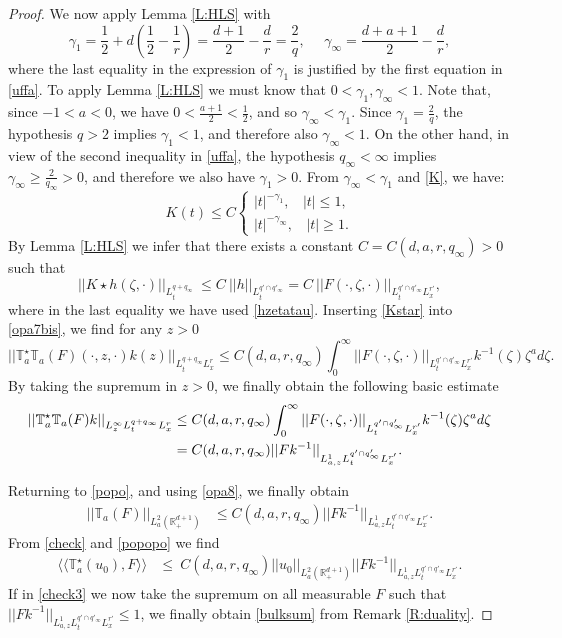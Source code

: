 \documentclass[11pt,letter]{amsart}
\def \RN {\mathbb{R}_+^{d+1}}
\numberwithin{equation}{section}
\newcommand{\sa}{\langle}
\newcommand{\da}{\rangle}
\numberwithin{equation}{section}
\begin{document}
\begin{proof}
We now apply Lemma \ref{L:HLS} with 
\[
\gamma_1 = \frac{1}2 + d(\frac 12 - \frac 1r) = \frac{d+1}2 - \frac dr = \frac 2q,\ \ \ \ \ \ \gamma_\infty = \frac{d+a+1}2 - \frac dr,
\]
where the last equality in the expression of $\gamma_1$ is justified by the first equation in \eqref{uffa}.
To apply Lemma \ref{L:HLS} we must know that $0<\gamma_1, \gamma_\infty <1$.  
Note that, since $-1<a<0$, we have $0<\frac{a+1}2 < \frac 12$, and so $\gamma_\infty<\gamma_1$. Since $\gamma_1 = \frac 2q$, the hypothesis $q>2$ implies $\gamma_1<1$, and therefore also $\gamma_\infty<1$. On the other hand, in view of the second inequality in \eqref{uffa}, the hypothesis $q_\infty <\infty$ implies $\gamma_\infty \ge  \frac{2}{q_\infty} >0$, and therefore we also have $\gamma_1>0$. From $\gamma_\infty<\gamma_1$ and \eqref{K}, we have: 
\[
K(t) \le C \begin{cases} 
|t|^{-\gamma_1},  \ \ \ \ |t|\le 1,
\\
|t|^{-\gamma_\infty},\ \ \ \ |t|\ge 1.
\end{cases}
\]
By Lemma \ref{L:HLS} we infer that there exists a constant $C=C(d,a,r,q_\infty)>0$ such that  
\begin{equation}\label{Kstar}
||K\star h(\zeta,\cdot)||_{L^{q+q_\infty}_t}\ \le C\ ||h||_{L^{q'\cap q'_\infty}_t} = C\ ||F(\cdot,\zeta,\cdot)||_{L^{q'\cap q'_\infty}_t L^{r'}_x},
\end{equation}
where in the last equality we have used \eqref{hzetatau}. Inserting \eqref{Kstar} into \eqref{opa7bis}, we find for any $z>0$
\[
||\mathbb T_a^\star \mathbb T_a(F)(\cdot,z,\cdot) k(z)||_{L^{q+q_\infty}_t L^r_x} \le C(d,a,r,q_\infty) \int_0^\infty ||F(\cdot,\zeta,\cdot)||_{L^{q'\cap q'_\infty}_t L^{r'}_x} k^{-1}(\zeta) \zeta^a d\zeta.
\]
By taking the supremum in $z>0$, we finally obtain the following basic estimate
\begin{align}\label{opa8}
||\mathbb T_a^\star \mathbb T_a(F) k||_{L^\infty_z L^{q+q_\infty}_t L^r_x} & \le C(d,a,r,q_\infty)  \int_0^\infty ||F(\cdot,\zeta,\cdot)||_{L^{q'\cap q'_\infty}_t L^{r'}_x} k^{-1}(\zeta) \zeta^a d\zeta
\\
& = C(d,a,r,q_\infty) ||F k^{-1}||_{L^1_{a,z} L^{q'\cap q'_\infty}_t L^{r'}_x}.
\notag
\end{align}


Returning to \eqref{popo}, and using \eqref{opa8},  we finally obtain 
\begin{align}\label{popopo}
||\mathbb T_a(F)||_{L_a^2(\RN)} & \le C(d,a,r,q_\infty) ||F k^{-1}||_{L^1_{a,z} L^{q' \cap q'_\infty}_t L^{r'}_x}.
\end{align}
From \eqref{check} and \eqref{popopo} we find
\begin{align}\label{check3}
\sa\sa \mathbb T^\star_a(u_0),F \da\da & \le\  C(d,a,r,q_\infty) ||u_0||_{L_a^2(\RN)}  ||F k^{-1}||_{L^1_{a,z} L^{q' \cap q'_\infty}_t L^{r'}_x}.
\end{align}
If in \eqref{check3} we now take the supremum on all measurable $F$ such that $||F k^{-1}||_{L^1_{a,z} L^{q' \cap q'_\infty}_t L^{r'}_x}\le 1$, we finally obtain \eqref{bulksum} from Remark \ref{R:duality}.





\end{proof}
\end{document}
